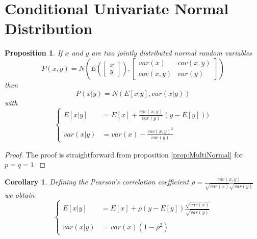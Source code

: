 \documentclass{article}
\newtheorem{prop}[thm]{Proposition}
\newtheorem{cor}[thm]{Corollary}
\theoremstyle{definition}
\theoremstyle{remark}
\begin{document}
\newpage
\section{Conditional Univariate Normal Distribution}\label{app:UniNormal}
\begin{prop}\label{prop:UniNormal} %
If $x$ and $y$ are two jointly distributed normal random variables
$$P(x,y)=N\left(
E\left( \begin{bmatrix} x\\ y \end{bmatrix} \right)
, \begin{bmatrix}
var(x) & cov(x,y)\\ 
cov(x,y) & var(y)
\end{bmatrix}\right)$$
then 
$$P(x|y)=N\left( E[x|y], var(x|y) \right)$$
with
\begin{equation*}
\left\{ 
\begin{array}{rl}
E[x|y]&=E[x]+\frac{cov(x,y)}{var(y)}(y-E[y]))\\
\\
var(x|y)&=var(x)-\frac{cov(x,y)^2}{var(y)}
\end{array} \right.
\end{equation*}
\end{prop}

\begin{proof}
The proof is straightforward from proposition \ref{prop:MultiNormal} for $p=q=1$.
\end{proof}

\begin{cor}
Defining the Pearson's correlation coefficient $\rho=\frac{cov(x,y)}{\sqrt{var(x)}\sqrt{var(y)}}$
we obtain
\begin{equation*}
\left\{ 
\begin{array}{rl}
E[x|y]&=E[x]+\rho(y-E[y])\frac{\sqrt{var(x)}}{\sqrt{var(y)}}\\
\\
var(x|y)&=var(x)(1-\rho^2)
\end{array} \right.
\end{equation*}
\end{cor}
\end{document}

